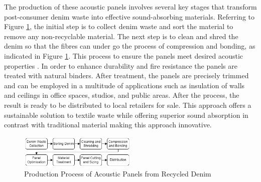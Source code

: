 The production of these acoustic panels involves several key stages that transform post-consumer denim waste into effective sound-absorbing materials. Referring to Figure \ref{fig:diagram}, the initial step is to collect denim waste and sort the material to remove any non-recyclable material. The next step is to clean and shred the denim so that the fibres can under go the process of compression and bonding, as indicated in Figure \ref{fig:diagram}. This process to ensure the panels meet desired acoustic properties \cite{JeansAcousticPanel}. In order to enhance durability and fire resistance the panels are treated with natural binders. After treatment, the panels are precisely trimmed and can be employed in a multitude of applications such as insulation of walls and ceilings in office spaces, studios, and public areas. After the process, the result is ready to be distributed to local retailers for sale. This approach offers a sustainable solution to textile waste while offering superior sound absorption in contrast with traditional material making this approach innovative. \\


\begin{figure}[h]
\includegraphics[width=0.5\textwidth]{figure/diagram.png}
\caption{Production Process of Acoustic Panels from Recycled Denim}
\label{fig:diagram}
\end{figure}
